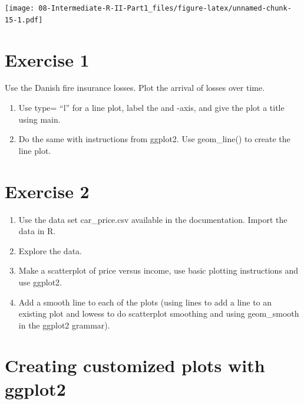 \documentclass[
]{book}
\providecommand{\tightlist}{%
  \setlength{\itemsep}{0pt}\setlength{\parskip}{0pt}}
\begin{document}
\texttt{[image: 08-Intermediate-R-II-Part1\_files/figure-latex/unnamed-chunk-15-1.pdf]}

\section*{Exercise 1}\label{exercise-1-6}

Use the Danish fire insurance losses. Plot the arrival of losses over time.

\begin{enumerate}
\def\labelenumi{\arabic{enumi}.}
\tightlist
\item
  Use type= ``l'' for a line plot, label the and -axis, and give the plot a title using main.
\item
  Do the same with instructions from ggplot2. Use geom\_line() to create the line plot.
\end{enumerate}

\section*{Exercise 2}\label{exercise-2-5}

\begin{enumerate}
\def\labelenumi{\arabic{enumi}.}
\item
  Use the data set car\_price.csv available in the documentation. Import the data in R.
\item
  Explore the data.
\item
  Make a scatterplot of price versus income, use basic plotting instructions
  and use ggplot2.
\item
  Add a smooth line to each of the plots (using lines to add a line to an existing plot and lowess to do scatterplot smoothing and using geom\_smooth in the ggplot2 grammar).
\end{enumerate}

\section*{Creating customized plots with ggplot2}\label{creating-customized-plots-with-ggplot2}
\end{document}
